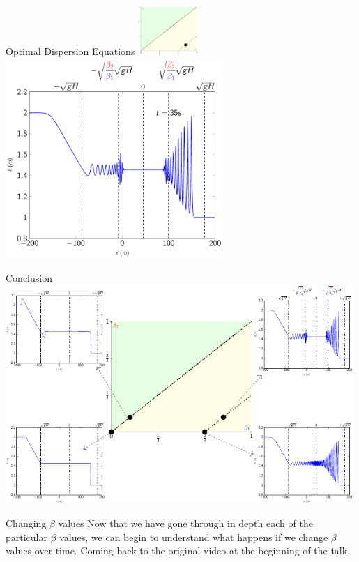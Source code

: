 \documentclass[pdf]{beamer}
\begin{document}
\begin{frame}{Optimal Dispersion Equations \hfill \includegraphics[width=0.17\textwidth]{./Pics/Tex/Explanatory/RegionsPlot/SPiSGN.pdf}}
\centering
\includegraphics[width=0.62\textwidth]{./Pics/Tex/Results/DB/iSGN/RegioniSGN.pdf}
\end{frame}


\begin{frame}{Conclusion}
\centering
\includegraphics[width=0.99\textwidth]{./Pics/Tex/Explanatory/RegDBV/3x3GridNoMovement.pdf}
\end{frame}


\begin{frame}{Changing $\beta$ values}
Now that we have gone through in depth each of the particular $\beta$ values, we can begin to understand what happens if we change $\beta$ values over time. Coming back to the original video at the beginning of the talk.
\end{frame}
\end{document}

